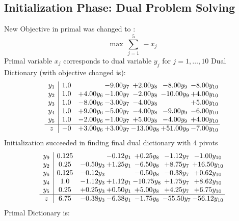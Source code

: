 \documentclass[8pt]{article}
\begin{document}
\subsection{Initialization Phase: Dual Problem Solving}
New Objective in primal was changed to : \[ \max\ \sum_{j=1}^{5}\ - x_j \] 
Primal variable $x_j$ corresponds to dual variable $y_j$ for $j = 1,\ldots,10$
Dual Dictionary (with objective changed is): 
\[\begin{array}{c| c c@{\hskip 2pt} c@{\hskip 2pt} c@{\hskip 2pt} c@{\hskip 2pt} c@{\hskip 2pt} }
 y_{1}   &  1.0  &   & -9.00 y_{7} & +  2.00 y_{8} & -8.00 y_{9} & -8.00 y_{10}\\
 y_{2}   &  1.0 & +  4.00 y_{6} & -1.00 y_{7} & -2.00 y_{8} & -10.00 y_{9} & +  4.00 y_{10}\\
 y_{3}   &  1.0 & -8.00 y_{6} & -3.00 y_{7} & -4.00 y_{8} &   & +  5.00 y_{10}\\
 y_{4}   &  1.0 & +  9.00 y_{6} & -5.00 y_{7} & -4.00 y_{8} & -9.00 y_{9} & -6.00 y_{10}\\
 y_{5}   &  1.0 & -2.00 y_{6} & -1.00 y_{7} & +  5.00 y_{8} & -4.00 y_{9} & +  4.00 y_{10}\\
\hline
z    &  -0 & +  3.00 y_{6} & +  3.00 y_{7} & -13.00 y_{8} & + 51.00 y_{9} & -7.00 y_{10}\\
\end{array}\]
Initialization succeeded in finding final dual dictionary with 4 pivots
\[\begin{array}{c| c c@{\hskip 2pt} c@{\hskip 2pt} c@{\hskip 2pt} c@{\hskip 2pt} c@{\hskip 2pt} }
 y_{9}   &  0.125  &   & -0.12 y_{1} & +  0.25 y_{8} & -1.12 y_{7} & -1.00 y_{10}\\
 y_{2}   &  0.25 & -0.50 y_{3} & +  1.25 y_{1} & -6.50 y_{8} & +  8.75 y_{7} & + 16.50 y_{10}\\
 y_{6}   &  0.125 & -0.12 y_{3} &   & -0.50 y_{8} & -0.38 y_{7} & +  0.62 y_{10}\\
 y_{4}   &  1.0 & -1.12 y_{3} & +  1.12 y_{1} & -10.75 y_{8} & +  1.75 y_{7} & +  8.62 y_{10}\\
 y_{5}   &  0.25 & +  0.25 y_{3} & +  0.50 y_{1} & +  5.00 y_{8} & +  4.25 y_{7} & +  6.75 y_{10}\\
\hline
z    &  6.75 & -0.38 y_{3} & -6.38 y_{1} & -1.75 y_{8} & -55.50 y_{7} & -56.12 y_{10}\\
\end{array}\]
Primal Dictionary is:
\end{document}
